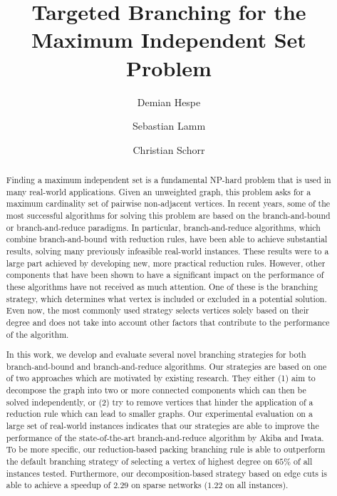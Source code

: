 \documentclass[a4paper,UKenglish,cleveref, autoref, thm-restate]{lipics-v2021}
\title{Targeted Branching for the Maximum Independent Set Problem} %
\author{Demian Hespe}{Karlsruhe Institute of Technology, Institute for
  Theoretical Informatics,
  Germany}{hespe@kit.edu}{https://orcid.org/0000-0001-6232-2951}{}
\author{Sebastian Lamm}{Karlsruhe Institute of Technology, Institute for
  Theoretical Informatics, Germany}{lamm@kit.edu}{https://orcid.org/0000-0001-7828-921X}{}
\author{Christian Schorr}{Karlsruhe Institute of Technology, Institute for
  Theoretical Informatics, Germany}{christian.schorr@student.kit.edu}{}{}
\begin{document}
\maketitle

\begin{abstract}
  Finding a maximum independent set is a fundamental NP-hard problem that is used in many real-world applications.
Given an unweighted graph, this problem asks for a maximum cardinality set of pairwise non-adjacent vertices.
In recent years, some of the most successful algorithms for solving this problem are based on the branch-and-bound or branch-and-reduce paradigms.
In particular, branch-and-reduce algorithms, which combine branch-and-bound with reduction rules, have been able to achieve substantial results, solving many previously infeasible real-world instances.
These results were to a large part achieved by developing new, more practical reduction rules.
However, other components that have been shown to have a significant impact on the performance of these algorithms have not received as much attention.
One of these is the branching strategy, which determines what vertex is included or excluded in a potential solution.
Even now, the most commonly used strategy selects vertices solely based on their degree and does not take into account other factors that contribute to the performance of the algorithm.

In this work, we develop and evaluate several novel branching strategies for both branch-and-bound and branch-and-reduce algorithms.
Our strategies are based on one of two approaches which are motivated by existing research. 
They either (1) aim to decompose the graph into two or more connected components which can then be solved independently, or (2) try to remove vertices that hinder the application of a reduction rule which can lead to smaller graphs.
Our experimental evaluation on a large set of real-world instances indicates
that our strategies are able to improve the performance of the state-of-the-art
branch-and-reduce algorithm by Akiba and Iwata. To be more specific,
our reduction-based packing branching rule is able to outperform the default
branching strategy of selecting a vertex of highest degree on $65\%$ of all
instances tested.
Furthermore, our decomposition-based strategy based on edge cuts is able to achieve a speedup of $2.29$ on sparse networks ($1.22$ on all instances).

\end{abstract}
\end{document}
